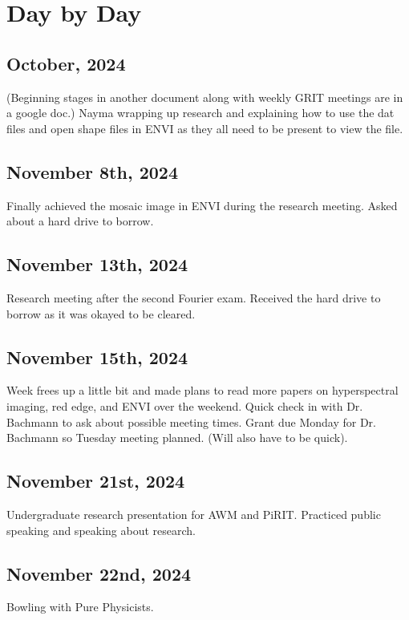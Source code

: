 \documentclass{article}
\begin{document}
\clearpage

\section{Day by Day}

\subsection{October, 2024}
(Beginning stages in another document along with weekly GRIT meetings are in a google doc.)
Nayma wrapping up research and explaining how to use the dat files and open shape files in ENVI as they all need to be present to view the file. 

\subsection{November 8th, 2024}
Finally achieved the mosaic image in ENVI during the research meeting. Asked about a hard drive to borrow.



\subsection{November 13th, 2024}
Research meeting after the second Fourier exam. Received the hard drive to borrow as it was okayed to be cleared.

\subsection{November 15th, 2024}
Week frees up a little bit and made plans to read more papers on hyperspectral imaging, red edge, and ENVI over the weekend. Quick check in with Dr. Bachmann to ask about possible meeting times. Grant due Monday for Dr. Bachmann so Tuesday meeting planned. (Will also have to be quick).

\subsection{November 21st, 2024}
Undergraduate research presentation for AWM and PiRIT. Practiced public speaking and speaking about research. 

\subsection{November 22nd, 2024}
Bowling with Pure Physicists.    
\end{document}
